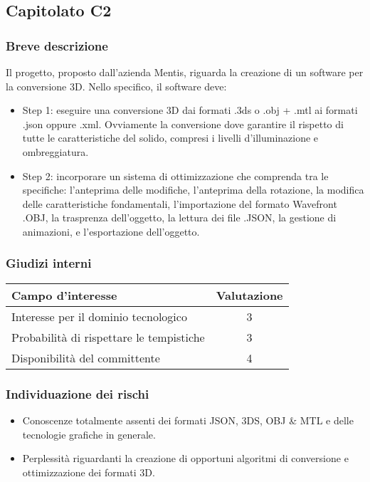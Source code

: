 \subsection{Capitolato C2}
\subsubsection{Breve descrizione}
Il progetto, proposto dall'azienda Mentis, riguarda la creazione di un software per la conversione 3D. Nello specifico, il software deve:
\begin{itemize}
	\item Step 1: eseguire una conversione 3D dai formati .3ds o .obj + .mtl ai formati .json oppure .xml. Ovviamente la conversione dove garantire il rispetto di tutte le caratteristiche del solido, compresi i livelli d'illuminazione e ombreggiatura.
	\item Step 2: incorporare un sistema di ottimizzazione che comprenda tra le specifiche: l'anteprima delle modifiche, l'anteprima della rotazione, la modifica delle caratteristiche fondamentali, l'importazione del formato Wavefront .OBJ, la trasprenza dell'oggetto, la lettura dei file .JSON, la gestione di animazioni, e l'esportazione dell'oggetto.
\end{itemize}
\subsubsection{Giudizi interni}
\begin{center}
\begin{tabular}{lc}
\toprule
Campo d'interesse & Valutazione\\
\midrule %
Interesse per il dominio tecnologico & 3\\
Probabilità di rispettare le tempistiche & 3\\
Disponibilità del committente & 4\\
\bottomrule
\end{tabular}
\end{center}
\subsubsection{Individuazione dei rischi}
\begin{itemize}
	\item Conoscenze totalmente assenti dei formati JSON, 3DS, OBJ \& MTL e delle tecnologie grafiche in generale.
	\item Perplessità riguardanti la creazione di opportuni algoritmi di conversione e ottimizzazione dei formati 3D.
\end{itemize}
